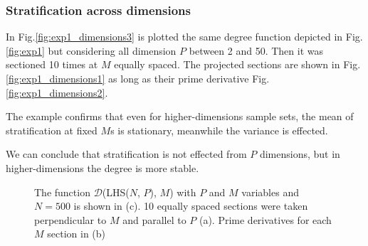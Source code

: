 \documentclass[12pt]{extarticle}
\newcommand{\mfigref}[1]{Fig.\ref{#1}}
\begin{document}
\subsubsection{Stratification across dimensions}
In \mfigref{fig:exp1_dimensions3} is plotted the same degree function depicted in \mfigref{fig:exp1} but considering all dimension $P$ between 2 and 50. Then it was sectioned 10 times at $M$ equally spaced. The projected sections are shown in \mfigref{fig:exp1_dimensions1} as long as their prime derivative \mfigref{fig:exp1_dimensions2}. 

The example confirms that even for higher-dimensions sample sets, the mean of stratification at fixed $M$s is stationary, meanwhile the variance is effected.

We can conclude that stratification is not effected from $P$ dimensions, but in higher-dimensions the degree is more stable.

\begin{figure}[H]
    \centering
    \begin{subfigure}[b]{1\textwidth}
        \centering
    \end{subfigure}
    \begin{subfigure}[b]{1\textwidth}
        \centering
    \end{subfigure}
\end{figure}
\begin{figure}
    \begin{subfigure}[b]{1\textwidth}
        \centering
    \end{subfigure}
    \captionsetup{skip=0pt}
    \caption{The function $\mathcal{D}$(LHS($N$, $P$), $M$) with $P$ and $M$ variables and $N = 500$ is shown in (c). 10 equally spaced sections were taken perpendicular to $M$ and parallel to $P$ (a).  Prime derivatives for each $M$ section in (b)}
    \label{fig:exp1_dimensions}

\end{figure}
\end{document}
